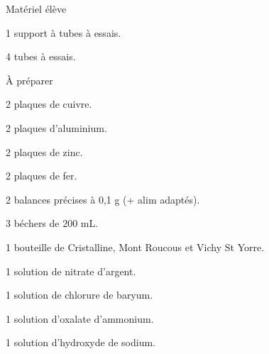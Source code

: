 
\begin{boiteMateriel}{Matériel élève}
  \effectifSeconde
  
  \begin{protocole}
    \item 1 support à tubes à essais.
    \item 4 tubes à essais.
  \end{protocole}
\end{boiteMateriel}


\begin{boiteMateriel}{À préparer}
  \begin{protocole}
    \item 2 plaques de cuivre.
    \item 2 plaques d'aluminium.
    \item 2 plaques de zinc.
    \item 2 plaques de fer.
    \item 2 balances précises à 0,1 g (+ alim adaptés).
    \item 3 béchers de 200 mL.
    \item 1 bouteille de Cristalline, Mont Roucous et Vichy St Yorre.
    \item 1 solution de nitrate d'argent.
    \item 1 solution de chlorure de baryum.
    \item 1 solution d'oxalate d'ammonium.
    \item 1 solution d'hydroxyde de sodium.
  \end{protocole}
\end{boiteMateriel}
